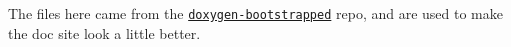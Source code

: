 The files here came from the \href{https://github.com/Velron/doxygen-bootstrapped/tree/4bfd385c1a5c1ae163f445ed1c84062d25b73147}{\tt doxygen-\/bootstrapped} repo, and are used to make the doc site look a little better. 
